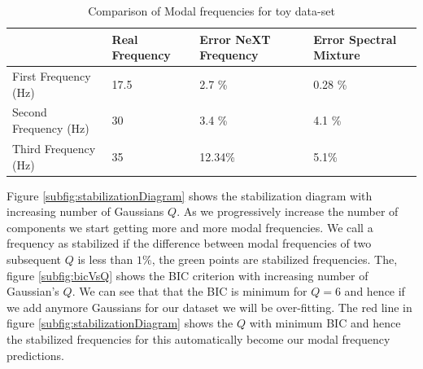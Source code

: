 \renewcommand{\arraystretch}{1}
\begin{table}[!ht]
    \centering
\begin{tabular}{|l|l|l|l|}
  \hline
   & Real Frequency & Error NeXT Frequency & Error Spectral Mixture\\
  \hline 
  \hline
First Frequency (Hz) & 17.5 & 2.7 \% & 0.28 \%\\
Second Frequency (Hz)  & 30 & 3.4 \% & 4.1 \%\\
Third Frequency (Hz) & 35 & 12.34\% & 5.1\%\\
   \hline
\end{tabular}
\caption{Comparison of Modal frequencies for toy data-set}
  \label{tabComparisonOfModalFrequenciesToyData}
\end{table}

Figure \ref{subfig:stabilizationDiagram} shows the stabilization diagram with increasing number of Gaussians $Q$. As we progressively increase the number of components we start getting more and more modal frequencies. We call a frequency as stabilized if the difference between modal frequencies of two subsequent $Q$ is less than $1\%$, the green points are stabilized frequencies. The, figure \ref{subfig:bicVsQ} shows the BIC criterion with increasing number of Gaussian's $Q$. We can see that that the BIC is minimum for $Q=6$ and hence if we add anymore Gaussians for our dataset we will be over-fitting. The red line in figure \ref{subfig:stabilizationDiagram} shows the $Q$ with minimum BIC and hence the stabilized frequencies for this automatically become our modal frequency predictions.

